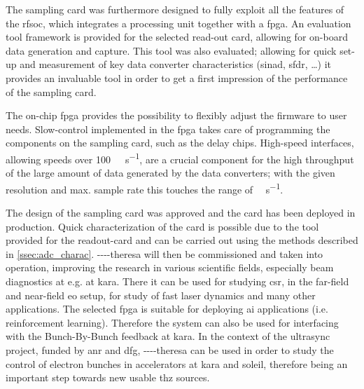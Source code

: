 The sampling card was furthermore designed to fully exploit all the features of the \gls{rfsoc}, which integrates a processing unit together with a \gls{fpga}.
An evaluation tool framework is provided for the selected read-out card, allowing for on-board data generation and capture.
This tool was also evaluated; allowing for quick set-up and measurement of key data converter characteristics (\gls{sinad}, \gls{sfdr}, \ldots) it provides an invaluable tool in order to get a first impression of the performance of the sampling card.

The on-chip \gls{fpga} provides the possibility to flexibly adjust the firmware to user needs. 
Slow-control implemented in the \gls{fpga} takes care of programming the components on the sampling card, such as the delay chips.
High-speed interfaces, allowing speeds over \SI{100}{\giga\bits\per\second}, are a crucial component for the high throughput of the large amount of data generated by the data converters; with the given resolution and max. sample rate this touches the range of \si{\tera\bits\per\second}.


The design of the sampling card was approved and the card has been deployed in production.
Quick characterization of the card is possible due to the tool provided for the readout-card and can be carried out using the methods described in \autoref{ssec:adc_charac}.
\gls{----theresa} will then be commissioned and taken into operation, improving the research in various scientific fields, especially beam diagnostics at e.g. at \gls{kara}. 
There it can be used for studying \gls{csr}, in the far-field and near-field \gls{eo} setup, for study of fast laser dynamics and many other applications.
The selected \gls{fpga} is suitable for deploying \gls{ai} applications (i.e. reinforcement learning).
Therefore the system can also be used for interfacing with the Bunch-By-Bunch feedback at \gls{kara}.
In the context of the \gls{ultrasync} project, funded by \gls{anr} and \gls{dfg}, \gls{----theresa} can be used in order to study the control of electron bunches in accelerators at \gls{kara} and \gls{soleil}, therefore being an important step towards new usable \gls{thz} sources. 
 

